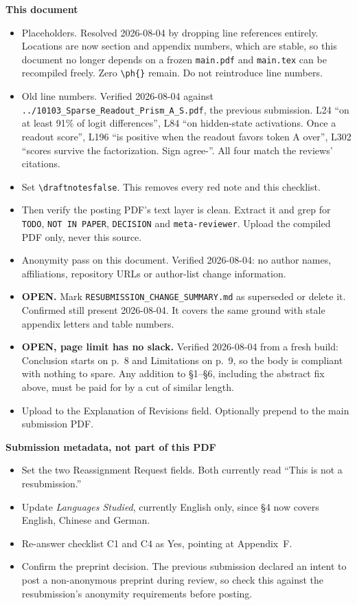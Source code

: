 \documentclass[11pt]{article}
\begin{document}
{\textbf{This document}
\begin{itemize}[label=$\square$]
\item[$\boxtimes$] Placeholders. Resolved 2026-08-04 by dropping line
references entirely. Locations are now section and appendix numbers, which
are stable, so this document no longer depends on a frozen \texttt{main.pdf}
and \texttt{main.tex} can be recompiled freely. Zero
\texttt{\textbackslash ph\{\}} remain. Do not reintroduce line numbers.
\item[$\boxtimes$] Old line numbers. Verified 2026-08-04 against
\texttt{../10103\_Sparse\_Readout\_Prism\_A\_S.pdf}, the previous submission.
L24 ``on at least 91\% of logit differences'', L84 ``on hidden-state
activations. Once a readout score'', L196 ``is positive when the readout
favors token A over'', L302 ``scores survive the factorization. Sign
agree-''. All four match the reviews' citations.
\item Set \texttt{\textbackslash draftnotesfalse}. This removes every red
note and this checklist.
\item Then verify the posting PDF's text layer is clean. Extract it and grep
for \texttt{TODO}, \texttt{NOT IN PAPER}, \texttt{DECISION} and
\texttt{meta-reviewer}. Upload the compiled PDF only, never this source.
\item[$\boxtimes$] Anonymity pass on this document. Verified 2026-08-04: no
author names, affiliations, repository URLs or author-list change
information.
\item \textbf{OPEN.} Mark \texttt{RESUBMISSION\_CHANGE\_SUMMARY.md} as
superseded or delete it. Confirmed still present 2026-08-04. It covers the
same ground with stale appendix letters and table numbers.
\item \textbf{OPEN, page limit has no slack.} Verified 2026-08-04 from a
fresh build: Conclusion starts on p.~8 and Limitations on p.~9, so the body
is compliant with nothing to spare. Any addition to \S1--\S6, including the
abstract fix above, must be paid for by a cut of similar length.
\item Upload to the Explanation of Revisions field. Optionally prepend to the
main submission PDF.
\end{itemize}

\textbf{Submission metadata, not part of this PDF}
\begin{itemize}[label=$\square$]
\item Set the two Reassignment Request fields. Both currently read ``This is
not a resubmission.''
\item Update \emph{Languages Studied}, currently English only, since \S4 now
covers English, Chinese and German.
\item Re-answer checklist C1 and C4 as Yes, pointing at Appendix~F.
\item Confirm the preprint decision. The previous submission declared an
intent to post a non-anonymous preprint during review, so check this against
the resubmission's anonymity requirements before posting.
\end{itemize}
}
\fi
\end{document}
